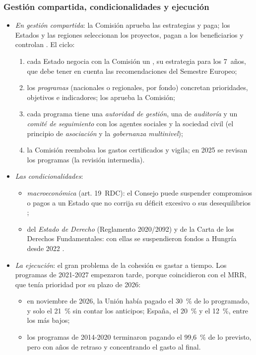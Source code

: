 \documentclass[11pt]{article}
\begin{document}
\subsubsection{Gestión compartida, condicionalidades y ejecución}

\begin{itemize}
\item \emph{En gestión compartida}: la Comisión aprueba las estrategias y paga; los Estados y las regiones seleccionan los proyectos, pagan a los beneficiarios y controlan . El ciclo:
  \begin{enumerate}
  \item cada Estado negocia con la Comisión un , su estrategia para los 7~años, que debe tener en cuenta las recomendaciones del Semestre Europeo;
  \item los \emph{programas} (nacionales o regionales, por fondo) concretan prioridades, objetivos e indicadores; los aprueba la Comisión;
  \item cada programa tiene una \emph{autoridad de gestión}, una de \emph{auditoría} y un \emph{comité de seguimiento} con los agentes sociales y la sociedad civil (el principio de \emph{asociación} y la \emph{gobernanza multinivel});
  \item la Comisión reembolsa los gastos certificados y vigila; en 2025 se revisan los programas (la revisión intermedia).
  \end{enumerate}
\item \emph{Las condicionalidades}:
  \begin{itemize}
  \item \emph{macroeconómica} (art. 19~RDC): el Consejo puede suspender compromisos o pagos a un Estado que no corrija su déficit excesivo o sus desequilibrios ;
  \item del \emph{Estado de Derecho} (Reglamento 2020/2092) y de la Carta de los Derechos Fundamentales: con ellas se suspendieron fondos a Hungría desde 2022 .
  \end{itemize}
\item \emph{La ejecución}: el gran problema de la cohesión es gastar a tiempo. Los programas de 2021-2027 empezaron tarde, porque coincidieron con el MRR, que tenía prioridad por su plazo de 2026:
  \begin{itemize}
  \item en noviembre de 2026, la Unión había pagado el 30~\% de lo programado, y solo el 21~\% sin contar los anticipos; España, el 20~\% y el 12~\%, entre los más bajos\nocite{CE2026Cohesiondata};
  \item los programas de 2014-2020 terminaron pagando el 99,6~\% de lo previsto, pero con años de retraso y concentrando el gasto al final\nocite{CE2026Cohesiondata}.
  \end{itemize}
\end{itemize}
\end{document}
